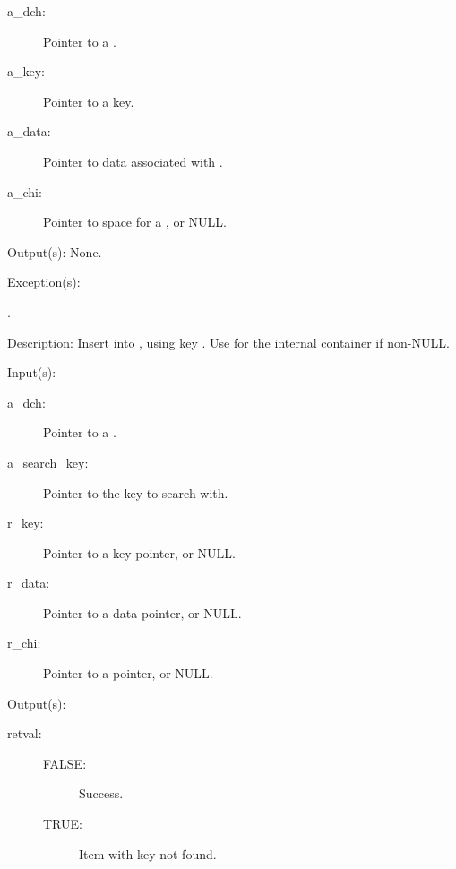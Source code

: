 \begin{capi}
\begin{capilist}
\begin{description}
		\item[a\_dch: ]
			Pointer to a .
		\item[a\_key: ]
			Pointer to a key.
		\item[a\_data: ]
			Pointer to data associated with .
		\item[a\_chi: ]
			Pointer to space for a , or NULL.
		\end{description}
	\item[Output(s): ] None.
	\item[Exception(s): ]
		\begin{description}\item[]
		\item[.]
		\end{description}
	\item[Description: ]
		Insert  into , using key
		.  Use  for the internal
		 container if non-NULL.
	\end{capilist}
\label{dch_remove}
	\begin{capilist}
	\item[Input(s): ]
		\begin{description}\item[]
		\item[a\_dch: ]
			Pointer to a .
		\item[a\_search\_key: ]
			Pointer to the key to search with.
		\item[r\_key: ]
			Pointer to a key pointer, or NULL.
		\item[r\_data: ]
			Pointer to a data pointer, or NULL.
		\item[r\_chi: ]
			Pointer to a  pointer, or NULL.
		\end{description}
	\item[Output(s): ]
		\begin{description}\item[]
		\item[retval: ]
			\begin{description}\item[]
			\item[FALSE: ]
				Success.
			\item[TRUE: ]
				Item with key  not	found.

\end{description}
\end{description}
\end{capilist}
\end{capi}
